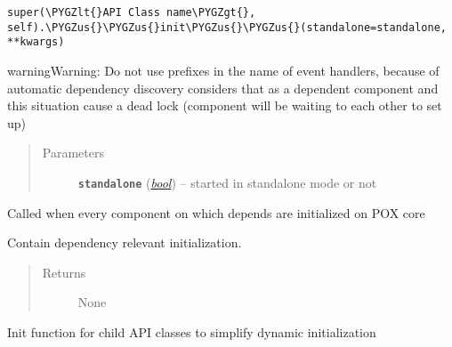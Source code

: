 \documentclass[letterpaper,10pt,english]{sphinxmanual}
\def\PYGZus{\char`\_}
\def\PYGZlt{\char`\<}
\def\PYGZgt{\char`\>}
\begin{document}
\begin{fulllineitems}
\begin{fulllineitems}
\begin{Verbatim}[commandchars=\\\{\}]
super(\PYGZlt{}API Class name\PYGZgt{}, self).\PYGZus{}\PYGZus{}init\PYGZus{}\PYGZus{}(standalone=standalone, **kwargs)
\end{Verbatim}

\begin{notice}{warning}{Warning:}
Do not use prefixes in the name of event handlers, because of automatic
dependency discovery considers that as a dependent component and this
situation cause a dead lock (component will be waiting to each other to
set up)
\end{notice}
\begin{quote}\begin{description}
\item[{Parameters}] \leavevmode
\textbf{\texttt{standalone}} (\href{https://docs.python.org/2.7/library/functions.html\#bool}{\emph{bool}}) -- started in standalone mode or not

\end{description}\end{quote}

\end{fulllineitems}


\begin{fulllineitems}
\label{util/api:escape.util.api.AbstractAPI._all_dependencies_met}
Called when every component on which depends are initialized on POX core

Contain dependency relevant initialization.
\begin{quote}\begin{description}
\item[{Returns}] \leavevmode
None

\end{description}\end{quote}

\end{fulllineitems}


\begin{fulllineitems}
\label{util/api:escape.util.api.AbstractAPI.initialize}
Init function for child API classes to simplify dynamic initialization


\end{fulllineitems}
\end{fulllineitems}
\end{document}
